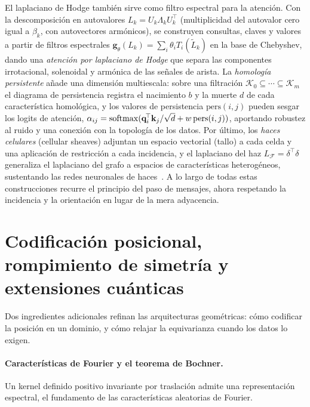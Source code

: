 El laplaciano de Hodge tambi\'en sirve como filtro espectral para la atenci\'on.
Con la descomposici\'on en autovalores $L_k = U_k\Lambda_k U_k^{\!\top}$
(multiplicidad del autovalor cero igual a $\beta_k$, con autovectores
arm\'onicos), se construyen consultas, claves y valores a partir de filtros
espectrales $\mathbf{g}_\theta(L_k) = \sum_i \theta_i T_i(\tilde L_k)$ en la base
de Chebyshev, dando una \emph{atenci\'on por laplaciano de Hodge} que separa las
componentes irrotacional, solenoidal y arm\'onica de las se\~nales de arista. La
\emph{homolog\'ia persistente} a\~nade una dimensi\'on multiescala: sobre una
filtraci\'on $\mathcal{K}_0 \subseteq \cdots \subseteq \mathcal{K}_m$ el diagrama
de persistencia registra el nacimiento $b$ y la muerte $d$ de cada
caracter\'istica homol\'ogica, y los valores de persistencia
$\mathrm{pers}(i, j)$ pueden sesgar los logits de atenci\'on,
$\alpha_{ij} = \operatorname{softmax}(\mathbf{q}_i^{\!\top}\mathbf{k}_j / \sqrt{d} + w\,
\mathrm{pers}(i,j))$, aportando robustez al ruido y una conexi\'on con la
topolog\'ia de los datos. Por \'ultimo, los \emph{haces celulares} (cellular
sheaves) adjuntan un espacio vectorial (tallo) a cada celda y una aplicaci\'on de
restricci\'on a cada incidencia, y el laplaciano del haz
$L_\mathcal{F} = \delta^{\!\top}\delta$ generaliza el laplaciano del grafo a
espacios de caracter\'isticas heterog\'eneos, sustentando las redes neuronales de
haces~\citep{hansen2021sheaf, bodnar2023cellular}. A lo largo de todas estas
construcciones recurre el principio del paso de mensajes, ahora respetando la
incidencia y la orientaci\'on en lugar de la mera adyacencia.

\section{Codificaci\'on posicional, rompimiento de simetr\'ia y extensiones
cu\'anticas}
\label{sec:gauge:positional}

Dos ingredientes adicionales refinan las arquitecturas geom\'etricas: c\'omo
codificar la posici\'on en un dominio, y c\'omo relajar la equivarianza cuando los
datos lo exigen.

\paragraph{Caracter\'isticas de Fourier y el teorema de Bochner.}
Un kernel definido positivo invariante por traslaci\'on admite una
representaci\'on espectral, el fundamento de las caracter\'isticas aleatorias de
Fourier.

